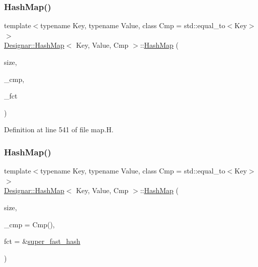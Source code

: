\subsubsection{\texorpdfstring{Hash\+Map()}{HashMap()}\hspace{0.1cm}{\footnotesize\ttfamily [1/7]}}
{\footnotesize\ttfamily template$<$typename Key, typename Value, class Cmp = std\+::equal\+\_\+to$<$\+Key$>$$>$ \\
\hyperlink{class_designar_1_1_hash_map}{Designar\+::\+Hash\+Map}$<$ Key, Value, Cmp $>$\+::\hyperlink{class_designar_1_1_hash_map}{Hash\+Map} (\begin{DoxyParamCaption}\item[{\hyperlink{namespace_designar_aa72662848b9f4815e7bf31a7cf3e33d1}{nat\+\_\+t}}]{size,  }\item[{Cmp \&}]{\+\_\+cmp,  }\item[{Hash\+Fct\+Ptr}]{\+\_\+fct }\end{DoxyParamCaption})\hspace{0.3cm}{\ttfamily [inline]}}



Definition at line 541 of file map.\+H.

\mbox{\label{class_designar_1_1_hash_map_aa82cf8d63637401365bebe4dafe556e2}} 
\subsubsection{\texorpdfstring{Hash\+Map()}{HashMap()}\hspace{0.1cm}{\footnotesize\ttfamily [2/7]}}
{\footnotesize\ttfamily template$<$typename Key, typename Value, class Cmp = std\+::equal\+\_\+to$<$\+Key$>$$>$ \\
\hyperlink{class_designar_1_1_hash_map}{Designar\+::\+Hash\+Map}$<$ Key, Value, Cmp $>$\+::\hyperlink{class_designar_1_1_hash_map}{Hash\+Map} (\begin{DoxyParamCaption}\item[{\hyperlink{namespace_designar_aa72662848b9f4815e7bf31a7cf3e33d1}{nat\+\_\+t}}]{size,  }\item[{Cmp \&\&}]{\+\_\+cmp = {\ttfamily Cmp()},  }\item[{Hash\+Fct\+Ptr}]{fct = {\ttfamily \&\hyperlink{namespace_designar_afd5712d16b3ae1c1c7d59f1004cd96fd}{super\+\_\+fast\+\_\+hash}} }\end{DoxyParamCaption})\hspace{0.3cm}{\ttfamily [inline]}}



